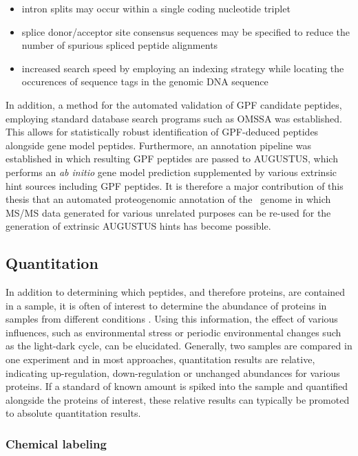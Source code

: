 \begin{itemize}
\item intron splits may occur within a single coding nucleotide triplet
\item splice donor/acceptor site consensus sequences may be specified to
reduce the number of spurious spliced peptide alignments
\item increased search speed by employing an indexing strategy while locating
the occurences of sequence tags in the genomic DNA sequence
\end{itemize}

In addition, a method for the automated validation of GPF candidate peptides,
employing standard database search programs such as OMSSA was established.
This allows for statistically robust identification of GPF-deduced peptides
alongside gene model peptides.
Furthermore, an annotation pipeline was established in which resulting GPF
peptides are passed to AUGUSTUS, which performs an {\em ab initio} gene 
model prediction supplemented by various extrinsic hint sources including
GPF peptides.
It is therefore a major contribution of this thesis that an automated
proteogenomic annotation of the \cre~genome in which MS/MS data generated
for various unrelated purposes can be re-used for the generation of
extrinsic AUGUSTUS hints has become possible.

\subsection{Quantitation}

In addition to determining which peptides, and therefore proteins, are 
contained in a sample, it is often of interest to determine the abundance
of proteins in samples from different conditions \citep{Schulze2010}.
Using this information, the effect of various influences, such as environmental 
stress or periodic environmental changes such as the light-dark cycle,
can be elucidated.
Generally, two samples are compared in one experiment and in most approaches, 
quantitation results are relative, indicating up-regulation, down-regulation 
or unchanged abundances for various proteins.
If a standard of known amount is spiked into the sample and quantified alongside
the proteins of interest, these relative results can typically be promoted to 
absolute quantitation results.

\subsubsection{Chemical labeling}

